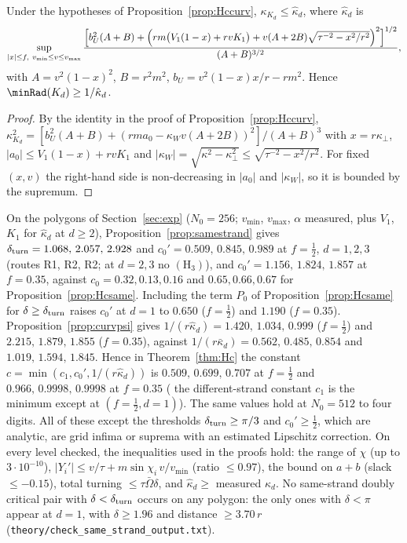 \begin{proposition}\label{prop:curvpsi}
Under the hypotheses of Proposition~\ref{prop:Hccurv}, $\kappa_{K_d}\le\hat\kappa_d$, where $\hat\kappa_d$ is
\[
\sup_{|x|\le f,\ v_{\min}\le v\le v_{\max}}
\frac{\Bigl[b_U^2(A+B)+\Bigl(rm\bigl(V_1(1-x)+rvK_1\bigr)+v(A+2B)\sqrt{\tau^{-2}-x^2/r^2}\Bigr)^2\Bigr]^{1/2}}{(A+B)^{3/2}},
\]
with $A=v^2(1-x)^2$, $B=r^2m^2$, $b_U=v^2(1-x)x/r-rm^2$. Hence $\minRad(K_d)\ge1/\hat\kappa_d$.
\end{proposition}
\begin{proof}
By the identity in the proof of Proposition~\ref{prop:Hccurv},
$\kappa_{K_d}^2=[b_U^2(A+B)+(rma_0-\kappa_Wv(A+2B))^2]/(A+B)^3$ with $x=r\kappa_\perp$,
$|a_0|\le V_1(1-x)+rvK_1$ and $|\kappa_W|=\sqrt{\kappa^2-\kappa_\perp^2}\le\sqrt{\tau^{-2}-x^2/r^2}$. For fixed $(x,v)$ the
right-hand side is non-decreasing in $|a_0|$ and $|\kappa_W|$, so it is bounded by the supremum.
\end{proof}

\begin{remark}\label{rem:samestrand-constants}
On the polygons of Section~\ref{sec:exp} ($N_0=256$; $v_{\min}$, $v_{\max}$, $\alpha$ measured, plus $V_1$, $K_1$ for
$\hat\kappa_d$ at $d\ge2$), Proposition~\ref{prop:samestrand} gives $\delta_{\rm turn}=1.068,\,2.057,\,2.928$ and
$c_0'=0.509,\,0.845,\,0.989$ at $f=\frac12$, $d=1,2,3$ (routes R1, R2, R2; at $d=2,3$ no $(\mathrm H_3)$), and
$c_0'=1.156,\,1.824,\,1.857$ at $f=0.35$, against $c_0=0.32,0.13,0.16$ and $0.65,0.66,0.67$ for
Proposition~\ref{prop:Hcsame}. Including the term $P_0$ of Proposition~\ref{prop:Hcsame} for $\delta\ge\delta_{\rm turn}$
raises $c_0'$ at $d=1$ to $0.650$ ($f=\frac12$) and $1.190$ ($f=0.35$). Proposition~\ref{prop:curvpsi} gives
$1/(r\hat\kappa_d)=1.420,\,1.034,\,0.999$ ($f=\frac12$) and $2.215,\,1.879,\,1.855$ ($f=0.35$), against
$1/(r\bar\kappa_d)=0.562,\,0.485,\,0.854$ and $1.019,\,1.594,\,1.845$. Hence in Theorem~\ref{thm:Hc} the constant
$c=\min(c_1,c_0',1/(r\hat\kappa_d))$ is $0.509,\,0.699,\,0.707$ at $f=\frac12$ and $0.966,\,0.9998,\,0.9998$ at $f=0.35$
( the different-strand constant $c_1$ is the minimum except at $(f=\frac12,d=1)$). The same values hold at
$N_0=512$ to four digits. All of these except the thresholds $\delta_{\rm turn}\ge\pi/3$ and $c_0'\ge\frac12$, which are
analytic, are grid infima or suprema with an estimated Lipschitz correction. On every level checked, the
inequalities used in the proofs hold: the range of $\chi$ (up to $3\cdot10^{-10}$), $|Y_i'|\le v/\tau+m\sin\chi_i\,v/v_{\min}$ (ratio $\le0.97$),
the bound on $a+b$ (slack $\le-0.15$), total turning $\le\tau\bar\Omega\delta$, and $\hat\kappa_d\ge$ measured $\kappa_d$. No same-strand doubly critical pair with $\delta<\delta_{\rm turn}$ occurs
on any polygon: the only ones with $\delta<\pi$ appear at $d=1$, with $\delta\ge1.96$ and distance $\ge3.70\,r$
(\texttt{theory/check\_same\_strand\_output.txt}).
\end{remark}

